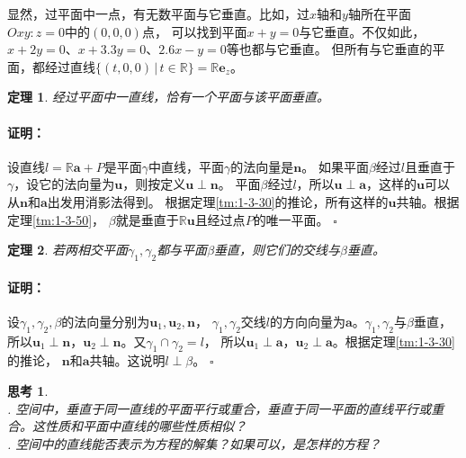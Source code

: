 \documentclass[12pt,UTF8]{ctexbook}
\newtheorem{tm}{定理}[section]
\renewenvironment{proof}{\paragraph{\textbf{证明：}}}{\hfill$\square$}
\newtheorem{sk}{思考}[section]
\begin{document}
显然，过平面中一点，有无数平面与它垂直。比如，过$x$轴和$y$轴所在平面$Oxy: z = 0$中的$(0,0,0)$点，
可以找到平面$x + y = 0$与它垂直。不仅如此，$x + 2y = 0$、$x + 3.3y = 0$、$2.6x - y = 0$等也都与它垂直。
但所有与它垂直的平面，都经过直线$\{(t,0,0) \, | \, t\in \mathbb{R}\} = \mathbb{R}\mathbf{e}_z$。
\begin{tm}\label{tm:1-3-90}
    经过平面中一直线，恰有一个平面与该平面垂直。    
\end{tm}
\begin{proof}
    设直线$l = \mathbb{R}\mathbf{a} + P$是平面$\gamma$中直线，平面$\gamma$的法向量是$\mathbf{n}$。
    如果平面$\beta$经过$l$且垂直于$\gamma$，设它的法向量为$\mathbf{u}$，则按定义$\mathbf{u}\perp\mathbf{n}$。
    平面$\beta$经过$l$，所以$\mathbf{u}\perp\mathbf{a}$，这样的$\mathbf{u}$可以从$\mathbf{n}$和$\mathbf{a}$出发用消影法得到。
    根据定理\ref{tm:1-3-30}的推论，所有这样的$\mathbf{u}$共轴。根据定理\ref{tm:1-3-50}，
    $\beta$就是垂直于$\mathbb{R}\mathbf{u}$且经过点$P$的唯一平面。
\end{proof}
\begin{tm}\label{tm:1-3-100}
    若两相交平面$\gamma_1,\gamma_2$都与平面$\beta$垂直，则它们的交线与$\beta$垂直。
\end{tm}
\begin{proof}
    设$\gamma_1,\gamma_2,\beta$的法向量分别为$\mathbf{u}_1,\mathbf{u}_2,\mathbf{n}$，
    $\gamma_1,\gamma_2$交线$l$的方向向量为$\mathbf{a}$。$\gamma_1,\gamma_2$与$\beta$垂直，
    所以$\mathbf{u}_1\perp\mathbf{n}$，$\mathbf{u}_2\perp\mathbf{n}$。又$\gamma_1\cap\gamma_2=l$，
    所以$\mathbf{u}_1\perp\mathbf{a}$，$\mathbf{u}_2\perp\mathbf{a}$。根据定理\ref{tm:1-3-30}的推论，
    $\mathbf{n}$和$\mathbf{a}$共轴。这说明$l\perp\beta$。
\end{proof}

\begin{sk}
    \mbox{} \\
    . 空间中，垂直于同一直线的平面平行或重合，垂直于同一平面的直线平行或重合。这性质和平面中直线的哪些性质相似？\\
    . 空间中的直线能否表示为方程的解集？如果可以，是怎样的方程？
\end{sk}
\end{document}
